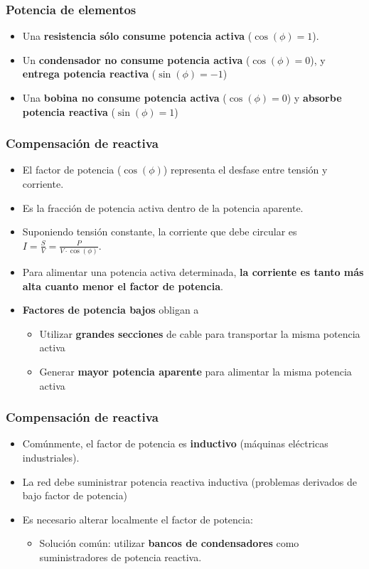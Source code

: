 \documentclass[serif, xcolor=dvipsnames]{beamer}
\begin{document}
\begin{frame}
  \frametitle{Potencia de elementos}
  \begin{itemize}
  \item Una \textbf{resistencia sólo consume potencia activa}
    ($\cos(\phi)=1$).
  \item Un \textbf{condensador no consume potencia activa}
    ($\cos(\phi)=0$), y \textbf{entrega potencia reactiva}
    ($\sin(\phi)=-1$)
  \item Una \textbf{bobina no consume potencia activa}
    ($\cos(\phi)=0$) y \textbf{absorbe potencia reactiva}
    ($\sin(\phi)=1$)
  \end{itemize}

\end{frame}
\begin{frame}
  \frametitle{Compensación de reactiva}
  \begin{itemize}
  \item El factor de potencia ($\cos(\phi)$) representa el desfase
    entre tensión y corriente.
  \item Es la fracción de potencia activa dentro de la potencia
    aparente.
  \item Suponiendo tensión constante, la corriente que debe circular
    es $I=\frac{S}{V}=\frac{P}{V\cdot\cos(\phi)}$.
  \item Para alimentar una potencia activa determinada, \textbf{la
      corriente es tanto más alta cuanto menor el factor de potencia}.
  \item \textbf{Factores de potencia bajos} obligan a

    \begin{itemize}
    \item Utilizar \textbf{grandes secciones} de cable para
      transportar la misma potencia activa
    \item Generar \textbf{mayor potencia aparente} para alimentar la
      misma potencia activa
    \end{itemize}
  \end{itemize}

\end{frame}
\begin{frame}
  \frametitle{Compensación de reactiva}
  \begin{itemize}
  \item Comúnmente, el factor de potencia es \textbf{inductivo}
    (máquinas eléctricas industriales).
  \item La red debe suministrar potencia reactiva inductiva (problemas
    derivados de bajo factor de potencia)
  \item Es necesario alterar localmente el factor de potencia:

    \begin{itemize}
    \item Solución común: utilizar \textbf{bancos de condensadores}
      como suministradores de potencia reactiva.
    \end{itemize}
  \end{itemize}

\end{frame}
\end{document}
